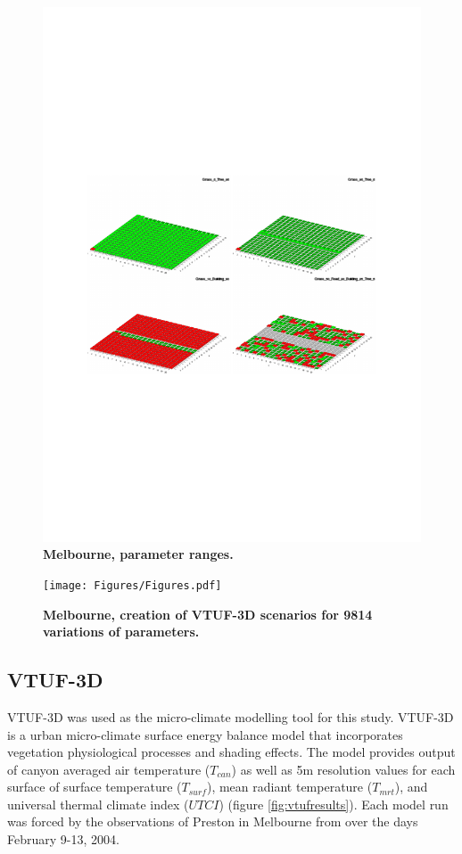 \documentclass[final,3p,times,authoryear]{elsarticle}
\begin{document}
\begin{figure}
\centering
\includegraphics[page=3,trim={55 240 60 240},clip,scale=0.65]{Figures/PresentationImages.pdf}
\caption{\bf Melbourne, parameter ranges.}
\end{figure} 

\begin{figure}
\centering
\texttt{[image: Figures/Figures.pdf]}
\caption{\bf Melbourne, creation of VTUF-3D scenarios for 9814 variations of parameters.}
 \label{fig:scenarios}
\end{figure} 






\subsection{VTUF-3D}\label{sec:methodsvtuf}
VTUF-3D \citep{Nice2018a} was used as the micro-climate modelling tool for this study. VTUF-3D is a urban micro-climate surface energy balance model that incorporates vegetation physiological processes and shading effects. The model provides output of canyon averaged air temperature ($T_{can}$) as well as 5m resolution values for each surface of surface temperature ($T_{surf}$), mean radiant temperature ($T_{mrt}$), and universal thermal climate index ($UTCI$) (figure \ref{fig:vtufresults}). Each model run was forced by the observations of Preston in Melbourne from \cite{Coutts2007} over the days February 9-13, 2004. 
\end{document}
